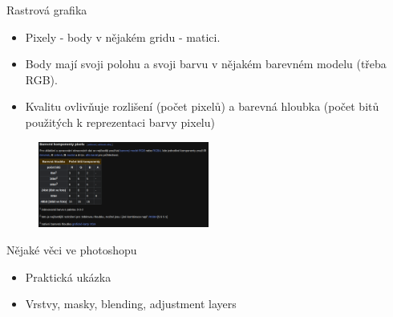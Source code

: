 \documentclass[aspectratio=169,xcolor=dvipsnames, t]{beamer}
\begin{document}
{\begin{frame}{Rastrová grafika}
    \begin{itemize}
        \item Pixely - body v nějakém gridu - matici.
        \item Body mají svoji polohu a svoji barvu v nějakém barevném modelu (třeba RGB).
        \item Kvalitu ovlivňuje rozlišení (počet pixelů) a barevná hloubka (počet bitů použitých k reprezentaci barvy pixelu)
    \end{itemize}
    \begin{figure}[H]
        \centering
        \includegraphics[width=0.5\textwidth]{a}
    \end{figure}
\end{frame}
\begin{frame}{Nějaké věci ve photoshopu}
    \begin{itemize}
        \item Praktická ukázka
        \item Vrstvy, masky, blending, adjustment layers
    \end{itemize}
\end{frame}

}
\end{document}
